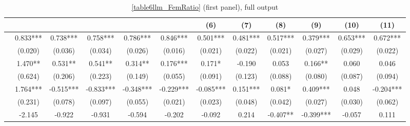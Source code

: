 \begin{table}
    \footnotesize
    \centering
    \begin{threeparttable}
        \caption{\autoref{table6llm_FemRatio} (first panel), full output}
        \label{table6llm_full}
        \begin{tabular}{p{4cm}S@{}S@{}S@{}S@{}S@{}S@{}S@{}S@{}S@{}S@{}S@{}}
            \toprule
            &{}&{}&{}&{}&{}&{(6)}&{(7)}&{(8)}&{(9)}&{(10)}&{(11)}\\
            \midrule
                    &       0.833***&       0.738***&       0.758***&       0.786***&       0.846***&       0.501***&       0.481***&       0.517***&       0.379***&       0.653***&       0.672***\\
                                          &     (0.020)   &     (0.036)   &     (0.034)   &     (0.026)   &     (0.016)   &     (0.021)   &     (0.022)   &     (0.021)   &     (0.027)   &     (0.029)   &     (0.022)   \\
                  &       1.470** &       0.531** &       0.541** &       0.314** &       0.176***&       0.171*  &      -0.190   &       0.053   &       0.166** &       0.060   &       0.046   \\
                                          &     (0.624)   &     (0.206)   &     (0.223)   &     (0.149)   &     (0.055)   &     (0.091)   &     (0.123)   &     (0.088)   &     (0.080)   &     (0.087)   &     (0.094)   \\
                  &       1.764***&      -0.515***&      -0.833***&      -0.348***&      -0.229***&      -0.085***&       0.151***&       0.081*  &       0.409***&       0.048   &      -0.204***\\
                                          &     (0.231)   &     (0.078)   &     (0.097)   &     (0.055)   &     (0.021)   &     (0.023)   &     (0.048)   &     (0.042)   &     (0.027)   &     (0.030)   &     (0.062)   \\
            &      -2.145   &      -0.922   &      -0.931   &      -0.594   &      -0.202   &      -0.092   &       0.214   &      -0.407** &      -0.399***&      -0.057   &       0.111   \\

\end{tabular}
\end{threeparttable}
\end{table}
